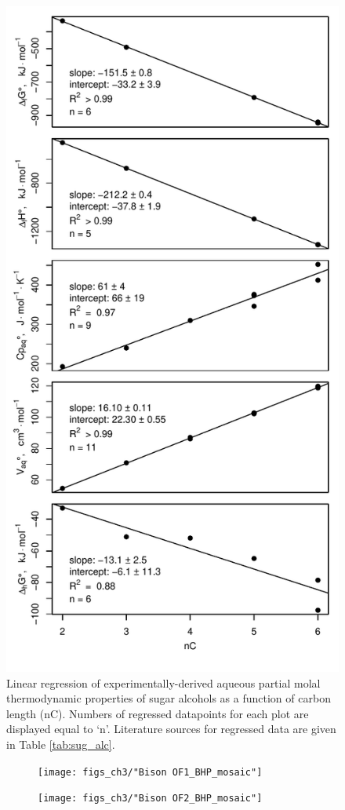 \singlespace
\begin{figure}[h]
\centering
\includegraphics[width=0.5\linewidth]{figs_ch3/polyol_prop_regress.pdf}
\caption[Linear regression of experimentally-derived aqueous partial molal thermodynamic properties of sugar alcohols as a function of carbon length]{Linear regression of experimentally-derived aqueous partial molal thermodynamic properties of sugar alcohols as a function of carbon length (nC). Numbers of regressed datapoints for each plot are displayed equal to `n'. Literature sources for regressed data are given in Table \ref{tab:sug_alc}.}
\label{fig:polyol_prop_regress}
\end{figure}
\doublespace


\singlespace
\begin{figure}[h]
\centering
    \begin{subfigure}[b]{\linewidth}
        \texttt{[image: figs\_ch3/"Bison OF1\_BHP\_mosaic"]}
        \label{fig:BP1_degform}
    \end{subfigure}
    \begin{subfigure}[b]{\linewidth}
        \texttt{[image: figs\_ch3/"Bison OF2\_BHP\_mosaic"]}
        \label{fig:BP2_degform}
    \end{subfigure}
\end{figure}

\newpage

